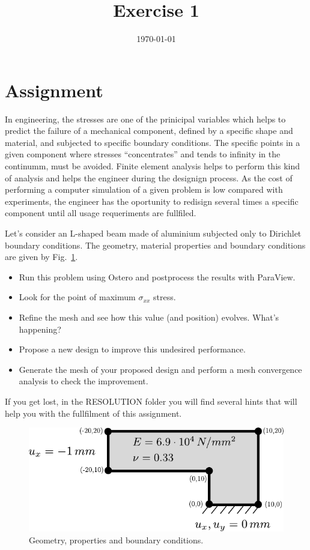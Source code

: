 \documentclass[12pt]{article}
\title{Exercise 1}
\date{\today}
\begin{document}
\maketitle

\section{Assignment}
In engineering, the stresses are one of the prinicipal variables which helps to predict the failure of a mechanical component, defined by a specific shape and material, and subjected to specific boundary conditions. The specific points in a given component where stresses ``concentrates'' and tends to infinity in the continumm, must be avoided. Finite element analysis helps to perform this kind of analysis and helps the engineer during the designign process. As the cost of performing a computer simulation of a given problem is low compared with experiments, the engineer has the oportunity to redisign several times a specific component until all usage requeriments are fullfiled. 

\medskip

Let's consider an L-shaped beam made of aluminium subjected only to Dirichlet boundary conditions. The geometry, material properties and boundary conditions are given by Fig.~\ref{fig:geometry}.
\begin{itemize}
\item Run this problem using Ostero and postprocess the results with ParaView. 
\item Look for the point of maximum $\sigma_{xx}$ stress.
\item Refine the mesh and see how this value (and position) evolves. What's happening?
\item Propose a new design to improve this undesired performance.
\item Generate the mesh of your proposed design and perform a mesh convergence analysis to check the improvement.
\end{itemize}

If you get lost, in the RESOLUTION folder you will find several hints that will help you with the fullfilment of this assignment.

\begin{figure}[htp]
\begin{center}
\includegraphics[width=1\linewidth]{Lbeam.pdf}
\caption{Geometry, properties and boundary conditions.}
\label{fig:geometry}
\end{center}
\end{figure}

\end{document}
